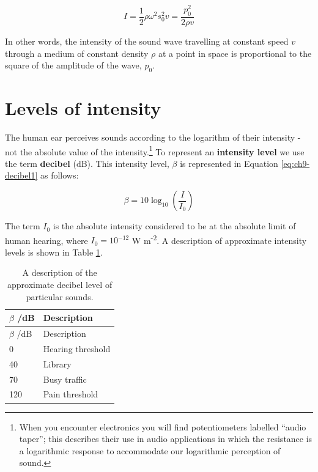 \documentclass[
]{book}
\begin{document}
\begin{equation}
I = \frac{1}{2}\rho \omega^2 s_0^2 v = \frac{p_0^2}{2\rho v}
\label{eq:ch9-waveintensity3}
\end{equation}

In other words, the intensity of the sound wave travelling at constant speed \(v\) through a medium of constant density \(\rho\) at a point in space is proportional to the square of the amplitude of the wave, \(p_0\).

\hypertarget{sec:ch9-intensitylevels}{%
\section{Levels of intensity}\label{sec:ch9-intensitylevels}}

The human ear perceives sounds according to the logarithm of their intensity - not the absolute value of the intensity.\footnote{When you encounter electronics you will find potentiometers labelled ``audio taper''; this describes their use in audio applications in which the resistance is a logarithmic response to accommodate our logarithmic perception of sound.} To represent an \textbf{intensity level} we use the term \textbf{decibel} (dB). This intensity level, \(\beta\) is represented in Equation \eqref{eq:ch9-decibel1} as follows:

\begin{equation}
\beta = 10 \log_{10}\left(\frac{I}{I_0}\right)
\label{eq:ch9-decibel1}
\end{equation}

The term \(I_0\) is the absolute intensity considered to be at the absolute limit of human hearing, where \(I_0 = 10^{-12}\) W m\textsuperscript{-2}. A description of approximate intensity levels is shown in Table \ref{tab:ch9-decibeldescription1}.

\begin{longtable}[]{@{}ll@{}}
\caption{\label{tab:ch9-decibeldescription1} A description of the approximate decibel level of particular sounds.}\tabularnewline
\toprule
\(\beta\) /dB & Description \\
\midrule
\endfirsthead
\toprule
\(\beta\) /dB & Description \\
\midrule
\endhead
0 & Hearing threshold \\
40 & Library \\
70 & Busy traffic \\
120 & Pain threshold \\
\bottomrule
\end{longtable}
\end{document}
